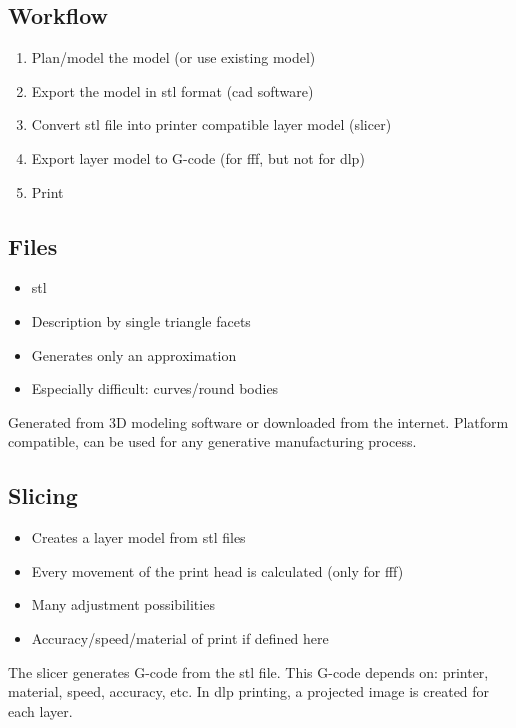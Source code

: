 \documentclass[aspectratio=169]{beamer}
\begin{document}
\subsection{Workflow}
\begin{frame}
    \begin{enumerate}
        \item Plan/model the model (or use existing model)
        \item Export the model in \acs{stl} format (\acs{cad} software)
        \item Convert \acs{stl} file into printer compatible layer model (slicer)
        \item Export layer model to G-code (for \acs{fff}, but not for \acs{dlp})
        \item Print
    \end{enumerate}
\end{frame}

\subsection{ Files}
\begin{frame}
    \begin{itemize}
        \item \acl{stl}
        \item Description by single triangle facets
        \item Generates only an approximation
        \item Especially difficult: curves/round bodies
    \end{itemize}
    \begin{exampleblock}{}
        Generated from 3D modeling software or downloaded from the internet.
        Platform compatible, can be used for any generative manufacturing process.
    \end{exampleblock}
\end{frame}

\subsection{Slicing}
\begin{frame}
    \begin{itemize}
        \item Creates a layer model from \acs{stl} files
        \item Every movement of the print head is calculated (only for \acs{fff})
        \item Many adjustment possibilities
        \item Accuracy/speed/material of print if defined here
    \end{itemize}
    \begin{exampleblock}{}
        The slicer generates G-code from the \acs{stl} file.
        This G-code depends on: printer, material, speed, accuracy, etc.
        In \acs{dlp} printing, a projected image is created for each layer.
    \end{exampleblock}
\end{frame}
\end{document}
